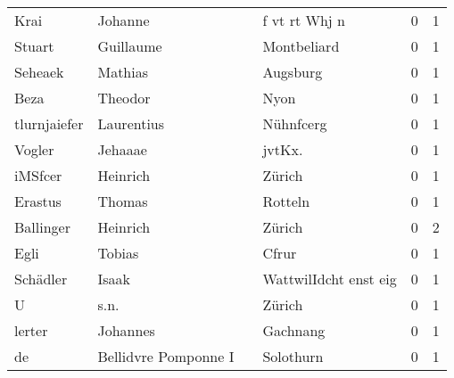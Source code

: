 \begin{center}
\begin{tiny}
\begin{longtabu}{llllrr}
                     Krai &                            Johanne &             &                               f vt rt Whj n &          0 &         1 \\
                   Stuart &                          Guillaume &             &                                 Montbeliard &          0 &         1 \\
                  Seheaek &                            Mathias &             &                                    Augsburg &          0 &         1 \\
                     Beza &                            Theodor &             &                                        Nyon &          0 &         1 \\
             tlurnjaiefer &                         Laurentius &             &                                   Nühnfcerg &          0 &         1 \\
                   Vogler &                            Jehaaae &             &                                     jvtKx.  &          0 &         1 \\
                  iMSfcer &                           Heinrich &             &                                      Zürich &          0 &         1 \\
                  Erastus &                             Thomas &             &                                     Rotteln &          0 &         1 \\
                Ballinger &                           Heinrich &             &                                      Zürich &          0 &         2 \\
                     Egli &                             Tobias &             &                                       Cfrur &          0 &         1 \\
                 Schädler &                              Isaak &             &                       WattwilIdcht enst eig &          0 &         1 \\
                        U &                               s.n. &             &                                      Zürich &          0 &         1 \\
                   lerter &                           Johannes &             &                                    Gachnang &          0 &         1 \\
                       de &               Bellidvre Pomponne I &             &                                   Solothurn &          0 &         1 \\

\end{longtabu}
\end{tiny}
\end{center}
